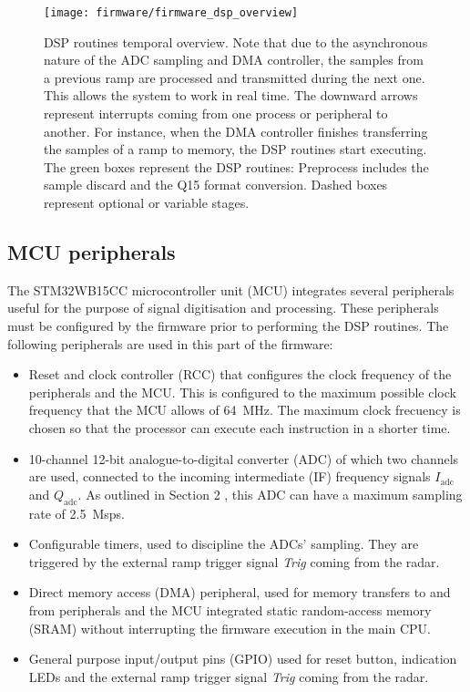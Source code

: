 \begin{figure}[ht]
	\centering
	\texttt{[image: firmware/firmware\_dsp\_overview]}
	\caption{DSP routines temporal overview. Note that due to the asynchronous nature of the ADC sampling and DMA controller, the samples from a previous ramp are processed and transmitted during the next one. This allows the system to work in real time. The downward arrows represent interrupts coming from one process or peripheral to another. For instance, when the DMA controller finishes transferring the samples of a ramp to memory, the DSP routines start executing. The green boxes represent the DSP routines: Preprocess includes the sample discard and the Q15 format conversion. Dashed boxes represent optional or variable stages.}
	\label{fig:firmware_dsp_overview}
\end{figure}

\subsection{MCU peripherals}

The STM32WB15CC microcontroller unit (MCU) integrates several peripherals useful for the purpose of signal digitisation and processing. These peripherals must be configured by the firmware prior to performing the DSP routines. The following peripherals are used in this part of the firmware:
\begin{itemize}
	\item Reset and clock controller (RCC) that configures the clock frequency of the peripherals and the MCU. This is configured to the maximum possible clock frequency that the MCU allows of \SI{64}{\mega\hertz}. The maximum clock frecuency is chosen so that the processor can execute each instruction in a shorter time.
	\item 10-channel 12-bit analogue-to-digital converter (ADC) of which two channels are used, connected to the incoming intermediate (IF) frequency signals $I_{\mathrm{adc}}$ and $Q_{\mathrm{adc}}$. As outlined in Section 2 %
	, this ADC can have a maximum sampling rate of \SI{2.5}{Msps}.
	\item Configurable timers, used to discipline the ADCs' sampling. They are trig\-gered by the external ramp trigger signal \textit{Trig} coming from the radar.
	\item Direct memory access (DMA) peripheral, used for memory transfers to and from peripherals and the MCU integrated static random-access memory (SRAM) without interrupting the firmware execution in the main CPU.
	\item General purpose input/output pins (GPIO) used for reset button, indication LEDs and the external ramp trigger signal \textit{Trig} coming from the radar.
\end{itemize}


